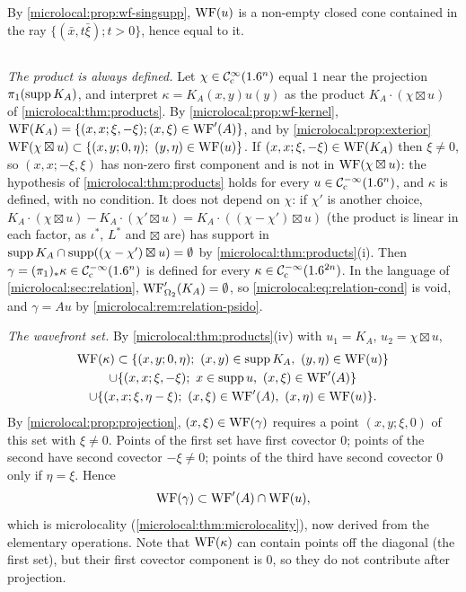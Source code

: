 By \cref{microlocal:prop:wf-singsupp}, $\operatorname{WF}(u)$ is a non-empty closed cone contained in the ray
$\{(\bar x,t\bar\xi);t>0\}$, hence equal to it.

\subsection*{}
\emph{The product is always defined.} Let $\chi\in\mathcal{C}^\infty_{\mathrm{c}}(1.6^n)$ equal $1$ near the projection
$\pi_1(\operatorname{supp} K_A)$, and interpret $\kappa=K_A(x,y)u(y)$ as the product $K_A\cdot(\chi\boxtimes u)$
of \cref{microlocal:thm:products}. By \cref{microlocal:prop:wf-kernel},
$\operatorname{WF}(K_A)=\{(x,x;\xi,-\xi);(x,\xi)\in\operatorname{WF}'(A)\}$, and by \cref{microlocal:prop:exterior}
$\WF(\chi\boxtimes u)\subset\{(x,y;0,\eta);\ (y,\eta)\in\WF(u)\}$. If $(x,x;\xi,-\xi)\in\operatorname{WF}(K_A)$ then
$\xi\ne0$, so $(x,x;-\xi,\xi)$ has non-zero first component and is not in $\operatorname{WF}(\chi\boxtimes u)$: the
hypothesis of \cref{microlocal:thm:products} holds for every $u\in\mathcal{C}^{-\infty}_{\mathrm{c}}(1.6^n)$, and $\kappa$ is
defined, with no condition. It does not depend on $\chi$: if $\chi'$ is another choice,
$K_A\cdot(\chi\boxtimes u)-K_A\cdot(\chi'\boxtimes u)=K_A\cdot((\chi-\chi')\boxtimes u)$ (the product is
linear in each factor, as $\iota^*$, $L^*$ and $\boxtimes$ are) has support in
$\operatorname{supp} K_A\cap\operatorname{supp}((\chi-\chi')\boxtimes u)=\emptyset$ by \cref{microlocal:thm:products}(i). Then
$\gamma=(\pi_1)_*\kappa\in\mathcal{C}^{-\infty}_{\mathrm{c}}(1.6^n)$ is defined for every $\kappa\in\mathcal{C}^{-\infty}_{\mathrm{c}}(1.6^{2n})$. In the language of
\cref{microlocal:sec:relation}, $\operatorname{WF}'_{\Omega_2}(K_A)=\emptyset$, so
\eqref{microlocal:eq:relation-cond} is void, and $\gamma=Au$ by
\cref{microlocal:rem:relation-psido}.

\emph{The wavefront set.} By \cref{microlocal:thm:products}(iv) with $u_1=K_A$, $u_2=\chi\boxtimes u$,
\begin{multline*}
  \WF(\kappa)\subset\{(x,y;0,\eta);\ (x,y)\in\supp K_A,\ (y,\eta)\in\WF(u)\}\\
  \cup\{(x,x;\xi,-\xi);\ x\in\supp u,\ (x,\xi)\in\WFp(A)\}\\
  \cup\{(x,x;\xi,\eta-\xi);\ (x,\xi)\in\WFp(A),\ (x,\eta)\in\WF(u)\}.
\end{multline*}
By \cref{microlocal:prop:projection}, $(x,\xi)\in\operatorname{WF}(\gamma)$ requires a point $(x,y;\xi,0)$ of this set
with $\xi\ne0$. Points of the first set have first covector $0$; points of the second have second
covector $-\xi\ne0$; points of the third have second covector $0$ only if $\eta=\xi$. Hence
\begin{equation*}
  \operatorname{WF}(\gamma)\subset\operatorname{WF}'(A)\cap\operatorname{WF}(u),
\end{equation*}
which is microlocality (\cref{microlocal:thm:microlocality}), now derived from the elementary
operations. Note that $\operatorname{WF}(\kappa)$ can contain points off the diagonal (the first set), but their first
covector component is $0$, so they do not contribute after projection.

